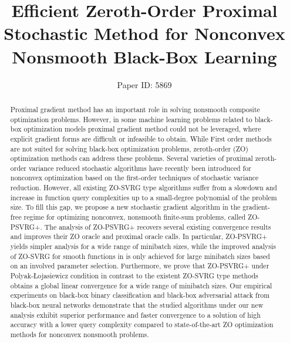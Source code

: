 \documentclass[letterpaper]{article} %
\begin{document}
%
\title{Efficient Zeroth-Order Proximal Stochastic Method for Nonconvex Nonsmooth Black-Box Learning}
\author{
Paper ID: 5869
}
\maketitle
\begin{abstract}
Proximal gradient method has an important role
in solving nonsmooth composite optimization problems. However, in some machine learning problems related to black-box optimization models proximal gradient method could not be leveraged, where explicit gradient forms are difficult or infeasible to obtain. While First order methods are not suited for solving black-box optimization problems, zeroth-order (ZO) optimization methods can address these problems. Several varieties of proximal zeroth-order variance reduced stochastic algorithms have recently been introduced for nonconvex optimization based on the first-order techniques of stochastic variance reduction. However, all existing ZO-SVRG type  algorithms suffer from a slowdown and increase in function query complexities up  to a small-degree  polynomial  of  the  problem  size. To fill this gap, we propose a new stochastic gradient algorithm in the gradient-free regime for optimizing nonconvex, nonsmooth finite-sum problems, called ZO-PSVRG+. The analysis of ZO-PSVRG+ recovers several existing convergence results and improves their ZO oracle and proximal oracle calls. In particular, ZO-PSVRG+ yields simpler analysis  for a wide range of minibatch sizes, while the improved analysis of ZO-SVRG for smooth functions in \cite{ji2019improved} is only achieved for large minibatch sizes based on an involved parameter selection. Furthermore, we prove that ZO-PSVRG+ under Polyak-Łojasiewicz condition in contrast to the existent ZO-SVRG type methods obtains a global linear convergence for a wide range of minibatch sizes. Our empirical experiments on black-box binary classification and black-box adversarial attack from black-box neural networks demonstrate that the studied algorithms under our new analysis exhibit superior performance and faster convergence to a solution of high accuracy with a lower query complexity compared to state-of-the-art ZO optimization methods for nonconvex nonsmooth problems.
\end{abstract}
\noindent 
\end{document}
